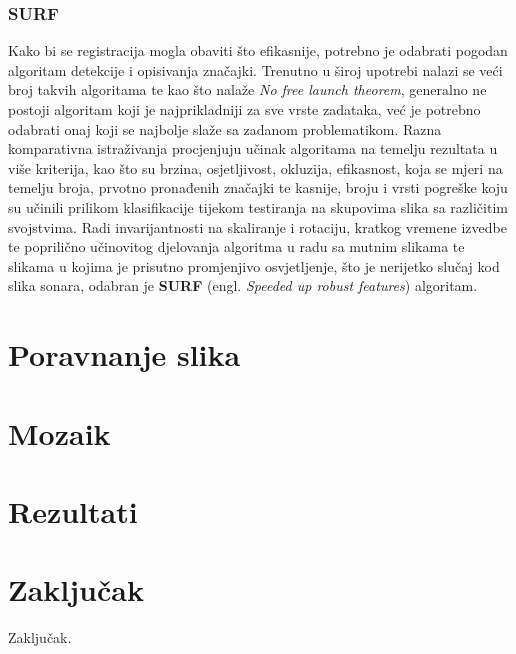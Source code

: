 \documentclass[times, utf8, diplomski]{fer}
\begin{document}
\subsection{SURF}
Kako bi se registracija mogla obaviti što efikasnije, potrebno je odabrati pogodan algoritam detekcije i opisivanja značajki. Trenutno u široj upotrebi nalazi se veći broj takvih algoritama te kao što nalaže \textit{No free launch theorem}, generalno ne postoji algoritam koji je najprikladniji za sve vrste zadataka, već je potrebno odabrati onaj koji se najbolje slaže sa zadanom problematikom. Razna komparativna istraživanja procjenjuju učinak algoritama na temelju rezultata u više kriterija, kao što su brzina, osjetljivost, okluzija, efikasnost, koja se mjeri na temelju broja, prvotno pronađenih značajki te kasnije, broju i vrsti pogreške koju su učinili prilikom klasifikacije tijekom testiranja na skupovima slika sa različitim svojstvima. Radi invarijantnosti na skaliranje i rotaciju, kratkog vremene izvedbe te poprilično učinovitog djelovanja algoritma u radu sa mutnim slikama te slikama u kojima je prisutno promjenjivo osvjetljenje, što je nerijetko slučaj kod slika sonara, odabran je \textbf{SURF} (engl. \textit{Speeded up robust features}) algoritam.


%
\chapter{Poravnanje slika}

\chapter{Mozaik}

\chapter{Rezultati}
\chapter{Zaključak}
Zaključak.



\end{document}

